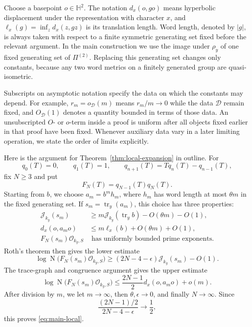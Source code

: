 \documentclass[11pt,reqno]{amsart}
\theoremstyle{definition}
\theoremstyle{remark}
\newcommand{\cO}{\mathcal O}
\newcommand{\cJ}{\mathcal J}
\newcommand{\Tr}{\operatorname{tr}}
\newcommand{\Norm}{\operatorname{N}}
\begin{document}
Choose a basepoint \(o\in\mathbb H^2\).  The notation
\(d_x(o,go)\) means hyperbolic displacement under the representation with
character \(x\), and \(\ell_x(g)=\inf_z d_x(z,gz)\) is its translation
length.  Word length, denoted by \(|g|\), is always taken with respect to a
finite symmetric generating set fixed before the relevant argument.  In the
main construction we use the image under \(\rho_y\) of one fixed generating
set of \(\Pi^{(2)}\).  Replacing this generating set changes only constants,
because any two word metrics on a finitely generated group are
quasi-isometric.

Subscripts on asymptotic notation specify the data on which the constants
may depend.
For example, \(r_m=o_{\mathcal D}(m)\) means
\(r_m/m\to0\) while the data \(\mathcal D\) remain fixed, and
\(O_{\mathcal D}(1)\) denotes a quantity bounded in terms of those data.
An unsubscripted \(O\)- or \(o\)-term inside a proof is uniform after all
objects fixed earlier in that proof have been fixed.  Whenever auxiliary
data vary in a later limiting operation, we state the order of limits
explicitly.

Here is the argument for Theorem~\ref{thm:local-expansion} in outline.
For
\[
 q_0(T)=0,\qquad q_1(T)=1,\qquad
 q_{n+1}(T)=Tq_n(T)-q_{n-1}(T),
\]
fix \(N\ge3\) and put
\[
 F_N(T)=q_{N-1}(T)q_N(T).
\]
Starting from \(b\), we choose
\(a_m=b^m h_m\), where \(h_m\) has word length at most \(\theta m\) in the
fixed generating set.  If
\(s_m=\Tr_y(a_m)\), this choice has three properties:
\begin{align*}
 \cJ_{k_y}(s_m)
   &\ge m\cJ_{k_y}(\Tr_y b)-O(\theta m)-O(1),\\
 d_x(o,a_mo)
   &\le m\ell_x(b)+O(\theta m)+O(1),\\
 F_N(s_m)\cO_{k_y,S}
   &\text{ has uniformly bounded prime exponents.}
\end{align*}
Roth's theorem then gives the lower estimate
\begin{equation}\label{eq:intro-roth}
 \log\Norm\bigl(F_N(s_m)\cO_{k_y,S}\bigr)
 \ge(2N-4-\epsilon)\cJ_{k_y}(s_m)-O(1).
\end{equation}
The trace-graph and congruence argument gives the upper estimate
\begin{equation}\label{eq:intro-wedge}
 \log\Norm\bigl(F_N(s_m)\cO_{k_y,S}\bigr)
 \le\frac{2N-1}{2}d_x(o,a_mo)+o(m).
\end{equation}
After division by \(m\), we let \(m\to\infty\), then
\(\theta,\epsilon\to0\), and finally \(N\to\infty\).  Since
\[
 \frac{(2N-1)/2}{2N-4-\epsilon}\longrightarrow\frac12,
\]
this proves \eqref{eq:main-local}.
\end{document}
